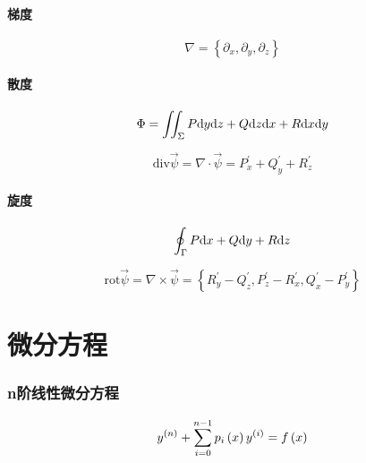 \documentclass{article}
\begin{document}
\subsection{梯度}

\begin{definition}[梯度]
    \[\nabla=\left\{\partial_x,\partial_y,\partial_z\right\}\]
\end{definition}

\subsection{散度}

\begin{definition}
    \[\Phi=\iint_\Sigma P\mathrm d y\mathrm d z+Q\mathrm d z\mathrm d x+R\mathrm d x\mathrm d y\]
\end{definition}

\begin{theorem}[散度]
    \[\mathrm{div}\vec\psi=
        \nabla\cdot\vec \psi=
        P_x^\prime+Q_y^\prime+R_z^\prime\]
\end{theorem}

\subsection{旋度}

\begin{definition}
    \[\oint_\Gamma P\mathrm d x+Q\mathrm d y+R \mathrm d z\]
\end{definition}

\begin{theorem}[旋度]
    \[\mathrm{rot}\vec\psi=
        \nabla\times\vec\psi=\left\{
        R_y^\prime-Q_z^\prime,
        P_z^\prime-R_x^\prime,
        Q_x^\prime-P_y^\prime
        \right\}\]
\end{theorem}

\part{微分方程}

\section{n阶线性微分方程}

\begin{definition}[]
    \[y^{\left(n\right)}+\sum_{i=0}^{n-1}p_i\left(x\right)y^{\left(i\right)}=f\left(x\right)\label{LinearDifferentialEquationsOfOrderN}\]
\end{definition}
\end{document}
